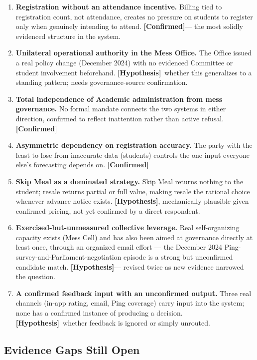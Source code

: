 \documentclass[11pt]{article}
\newcommand{\confirmed}{\textbf{[Confirmed]}}
\newcommand{\hypo}{\textbf{[Hypothesis]}}
\begin{document}
\begin{enumerate}
    \item \textbf{Registration without an attendance incentive.} Billing tied to
        registration count, not attendance, creates no pressure on students to
        register only when genuinely intending to attend. \confirmed --- the most
        solidly evidenced structure in the system.
    \item \textbf{Unilateral operational authority in the Mess Office.} The Office
        issued a real policy change (December 2024) with no evidenced Committee or
        student involvement beforehand. \hypo\ whether this generalizes to a
        standing pattern; needs governance-source confirmation.
    \item \textbf{Total independence of Academic administration from mess
        governance.} No formal mandate connects the two systems in either direction,
        confirmed to reflect inattention rather than active refusal. \confirmed
    \item \textbf{Asymmetric dependency on registration accuracy.} The party with the
        least to lose from inaccurate data (students) controls the one input
        everyone else's forecasting depends on. \confirmed
    \item \textbf{Skip Meal as a dominated strategy.} Skip Meal returns nothing to
        the student; resale returns partial or full value, making resale the
        rational choice whenever advance notice exists. \hypo, mechanically
        plausible given confirmed pricing, not yet confirmed by a direct respondent.
    \item \textbf{Exercised-but-unmeasured collective leverage.} Real self-organizing
        capacity exists (Mess Cell) and has also been aimed at governance directly
        at least once, through an organized email effort --- the December 2024
        Ping-survey-and-Parliament-negotiation episode is a strong but unconfirmed
        candidate match. \hypo --- revised twice as new evidence narrowed the
        question.
    \item \textbf{A confirmed feedback input with an unconfirmed output.} Three real
        channels (in-app rating, email, Ping coverage) carry input into the system;
        none has a confirmed instance of producing a decision. \hypo\ whether
        feedback is ignored or simply unrouted.
\end{enumerate}

\subsection{Evidence Gaps Still Open}
\end{document}
